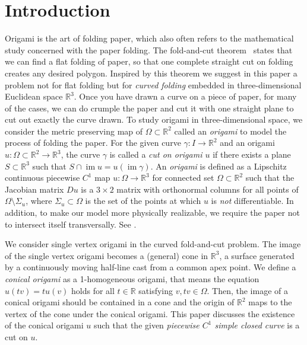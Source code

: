 \documentclass{amsart}
\theoremstyle{plain}
\theoremstyle{definition}
\theoremstyle{remark}
\DeclareMathOperator{\im}{im}
\begin{document}
\section{Introduction}%
Origami is the art of folding paper, which also often refers to the mathematical study concerned with the paper folding.
The fold-and-cut theorem~\cite{demaine2000folding} states that we can find a flat folding of paper, so that one complete straight cut on folding creates any desired polygon.
Inspired by this theorem we suggest in this paper a problem not for flat folding but for \emph{curved folding} embedded in three-dimensional Euclidean space $\mathbb{R}^3$.
Once you have drawn a curve on a piece of paper, for many of the cases, we can do crumple the paper and cut it with one straight plane to cut out exactly the curve drawn.
To study origami in three-dimensional space, we consider the metric preserving map of ${\Omega\subset\mathbb R}^2$ called an \emph{origami} to model the process of folding the paper.
For the given curve $\gamma \colon I\to\mathbb{R}^2$ and an origami $u \colon \Omega \subset \mathbb{R}^2\to\mathbb{R}^3$, the curve $\gamma$ is called a \emph{cut on origami $u$} if there exists a plane $S\subset\mathbb{R}^3$ such that $S\cap\im u=u(\im\gamma)$.
An \emph{origami} is defined as a Lipschitz continuous piecewise $C^1$ map $u \colon \Omega\to\mathbb{R}^3$ for connected set $\Omega\subset\mathbb{R}^2$ such that the Jacobian matrix $Du$ is a $3\times 2$ matrix with orthonormal columns for all points of $\Omega\setminus\Sigma_u$, where $\Sigma_u\subset\Omega$ is the set of the points at which $u$ is \emph{not} differentiable. 
In addition, to make our model more physically realizable, we require the paper not to intersect itself transversally.
See \cite{dacorogna2008lipschitz}.

We consider single vertex origami in the curved fold-and-cut problem.
The image of the single vertex origami becomes a (general) cone in $\mathbb{R}^3$, a surface generated by a continuously moving half-line cast from a common apex point.
We define a \emph{conical origami} as a 1-homogeneous origami, that means the equation $u(tv)=tu(v)$ holds for all $t\in\mathbb{R}$ satisfying $v,tv\in\Omega$. %
Then, the image of a conical origami should be contained in a cone and the origin of $\mathbb{R}^2$ maps to the vertex of the cone under the conical origami. %
This paper discusses the existence of the conical origami $u$ such that the given \emph{piecewise $C^1$ simple closed curve} is a cut on $u$.
\end{document}
